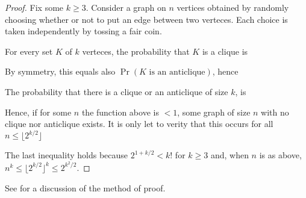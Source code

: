 \documentclass[scombinatorics.tex]{subfiles}
\begin{document}
\begin{proof}
  Fix some $k\ge3$. Consider a graph on $n$ vertices obtained by randomly choosing whether or not to put an edge between two verteces.
  Each choice is taken independently by tossing a fair coin.

  For every set $K$ of $k$ verteces, the probability that $K$ is a clique is 


  By symmetry, this equals also $\Pr(K\textrm{ is an anticlique})$, hence


  The probability that there is a clique or an anticlique of size $k$, is 


  Hence, if for some $n$ the function above is $<1$, some graph of size $n$ with no clique nor anticlique exists. 
  It is only let to verity that this occurs for all $n\le\lfloor2^{k/2}\rfloor$ 


  
  

The last inequality holds because $2^{1+k/2}<k!$ for $k\ge3$ and, when $n$ is as above, $n^k\le\lfloor2^{k/2}\rfloor^k\le 2^{k^2/2}$.
\end{proof}

See \cite{AS} for a discussion of the method of proof.
\end{document}
